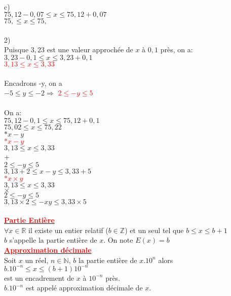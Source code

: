 \documentclass[12pt]{article}
\begin{document}
\\
c)\\
$75,12-0,07\leq x \leq 75,12+0,07$\\
$75,\leq x \leq 75,$\\
\\
2)\\
Puisque $3,23$ est une valeur approchée de 
$x$ à $0,1$ près, on a:\\
$3,23-0,1\leq x \leq 3,23+0,1$\\
\underline{\textcolor{red}{$3,13\leq x \leq 3,33$}}\\
\\
Encadrons -y, on a\\
$-5\leqslant y \leqslant -2 \Longrightarrow$ \underline{\textcolor{red}{$2\leqslant -y \leqslant 5$}}\\
\\
On a: \\
$75,12-0,1\leq x \leq 75,12+0,1$\\
$75,02\leq x \leq 75,22$\\
$\ast x-y$\\
\textcolor{red}{$\ast x-y$}\\
$3,13\leq x \leq 3,33$\\
+\\
$2\leqslant -y \leqslant 5$\\
$3,13+2\leq x-y \leq 3,33+5$\\
\textcolor{red}{$\ast x \times y$}\\
$3,13\leq x \leq 3,33$\\
$\times$\\
$2\leqslant -y \leqslant 5$\\
$3,13\times2 \leq -xy \leq 3,33\times5$\\
\\
\underline{\textbf{\textcolor{red}{Partie Entière}}}\\
$\forall x \in \mathbb{R}$  il existe un entier relatif ($b \in \mathbb{Z}$) et un seul tel que $b \leq x \leq b+1$\\ $b$  s'appelle la partie entière de $x$. On note $E(x)=b$\\
\underline{\textbf{\textcolor{red}{Approximation décimale }}}\\
Soit $x$ un réel, $n \in \mathbb{N}$, $b$ la partie entière de $x$.$10^{n}$ alors\\
$b.10^{-n} \leq x \leq (b+1)10^{-n}$\\
est un encadrement de $x$ à $10^{-n}$ près.\\
$b.10^{-n}$  est appelé approximation décimale de $x$.
\end{document}
